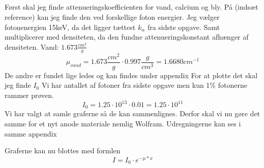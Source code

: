 \documentclass[a4paper,twoside]{article}
\begin{document}
\subsection{}
Først skal jeg finde attenueringskoefficienten for vand, calcium og bly. På (indsæt reference) kan jeg finde den ved forskellige foton energier. Jeg vælger fotonenergien 15keV, da det ligger tættest $k_{\alpha}$ fra sidste opgave. Samt multiplicerer med densiteten, da den fundne attenueringskonstant afhænger af densiteten.
Vand: $1.673 \frac{cm^2}{g}$
\begin{equation*}
    \mu_{vand}=1.673 \frac{cm^2}{g}\cdot0.997 \frac{g}{cm^3}=1.6680 cm^{-1}
\end{equation*}
De andre er fundet lige ledes og kan findes under appendix
For at plotte det skal jeg finde $I_0$
Vi har antallet af fotoner fra sidste opgave men kun 1\% fotonerne rammer prøven. 
\begin{equation*}
   I_0= 1.25\cdot10^{13}\cdot0.01=1.25\cdot10^{11} 
 
\end{equation*}
Vi har valgt at samle graferne så de kan sammenlignes. Derfor skal vi nu gøre det samme for et nyt anode materiale nemlig Wolfram. 
Udregningerne kan ses i samme appendix

  Graferne kan nu blottes med formlen
  \begin{equation}
      I=I_0\cdot e^{-\mu*x}
  \end{equation}
\end{document}
